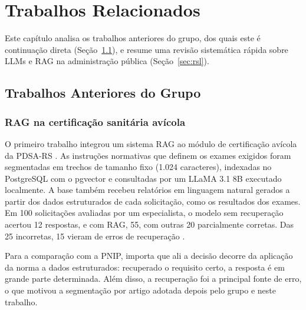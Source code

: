 \chapter{Trabalhos Relacionados}
\label{cap:trabalhos-relacionados}

Este capítulo analisa os trabalhos anteriores do grupo, dos quais este é continuação direta (Seção~\ref{sec:tr-grupo}), e resume uma revisão sistemática rápida sobre LLMs e RAG na administração pública (Seção~\ref{sec:rsl}).

\section{Trabalhos Anteriores do Grupo}
\label{sec:tr-grupo}

\subsection{RAG na certificação sanitária avícola}

O primeiro trabalho integrou um sistema RAG ao módulo de certificação avícola da PDSA-RS \cite{Montero2025iceis,Montero2025}. As instruções normativas que definem os exames exigidos foram segmentadas em trechos de tamanho fixo (1.024 caracteres), indexadas no PostgreSQL com o pgvector e consultadas por um LLaMA 3.1 8B executado localmente. A base também recebeu relatórios em linguagem natural gerados a partir dos dados estruturados de cada solicitação, como os resultados dos exames. Em 100 solicitações avaliadas por um especialista, o modelo sem recuperação acertou 12 respostas, e com RAG, 55, com outras 20 parcialmente corretas. Das 25 incorretas, 15 vieram de erros de recuperação \cite{Montero2025}.

Para a comparação com a PNIP, importa que ali a decisão decorre da aplicação da norma a dados estruturados: recuperado o requisito certo, a resposta é em grande parte determinada. Além disso, a recuperação foi a principal fonte de erro, o que motivou a segmentação por artigo adotada depois pelo grupo e neste trabalho.

